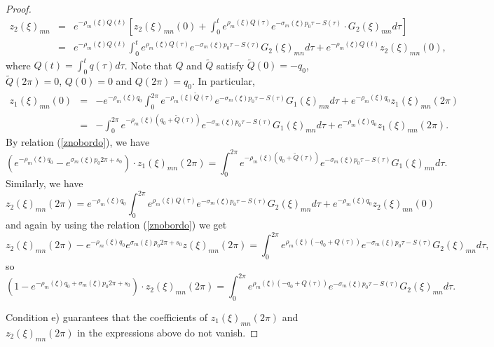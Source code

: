 \documentclass[sn-mathphys-num]{sn-jnl}%
\numberwithin{equation}{section}
\theoremstyle{thmstyleone}
\theoremstyle{thmstyletwo}
\theoremstyle{thmstylethree}
\begin{document}
\begin{proof}
\begin{eqnarray*}
		z_2(\xi)_{mn}& = & e^{-\rho_m(\xi)Q(t)}\left[ z_2(\xi)_{mn}(0)+\int_0^t e^{\rho_m(\xi)Q(\tau)}e^{-\sigma_m(\xi)p_0 \tau -S(\tau)}\cdot G_2(\xi)_{mn}d\tau \right] \\
		& = & e^{-\rho_m(\xi)Q(t)}\int_0^t e^{\rho_m(\xi)Q(\tau)}e^{-\sigma_m(\xi)p_0 \tau -S(\tau)}G_2(\xi)_{mn}d\tau +e^{-\rho_m(\xi)Q(t)}z_2(\xi)_{mn}(0),
\end{eqnarray*}
where $Q(t)=\int_0^t q(\tau)d\tau$. Note that $Q$ and $\widetilde{Q}$ satisfy $\widetilde{Q}(0)=-q_0$, $\widetilde{Q}(2\pi)=0$, $Q(0)=0$ and $Q(2\pi)=q_0$. In particular, 
\begin{eqnarray*} z_1(\xi)_{mn}(0) & = & -e^{-\rho_m(\xi)q_0}\int_0^{2\pi}e^{-\rho_m(\xi)\widetilde{Q}(\tau)}e^{-\sigma_m(\xi)p_0 \tau -S(\tau)}G_1(\xi)_{mn}d\tau +e^{-\rho_m(\xi)q_0}z_1(\xi)_{mn}(2\pi)\\
	& = & -\int_0^{2\pi} e^{-\rho_m(\xi)(q_0+\widetilde{Q}(\tau))}e^{-\sigma_m(\xi)p_0 \tau-S(\tau)}G_1(\xi)_{mn}d\tau +e^{-\rho_m(\xi)q_0}z_1(\xi)_{mn}(2\pi).
\end{eqnarray*} 
By relation (\ref{znobordo}), we have
\begin{equation}\label{z_1nobordo}
	\left( e^{-\rho_m(\xi)q_0}-e^{\sigma_m(\xi)p_0 2\pi+s_0}\right)\cdot z_1(\xi)_{mn}(2\pi) = \int_0^{2\pi} e^{-\rho_m(\xi)(q_0+\widetilde{Q}(\tau))}e^{-\sigma_m(\xi)p_0 \tau-S(\tau)}G_1(\xi)_{mn}d\tau.
\end{equation}
Similarly, we have
$$z_2(\xi)_{mn}(2\pi)=e^{-\rho_m(\xi)q_0}\int_0^{2\pi} e^{\rho_m(\xi)Q(\tau)}e^{-\sigma_m(\xi)p_0 \tau -S(\tau)}G_2(\xi)_{mn}d\tau +e^{-\rho_m(\xi)q_0}z_2(\xi)_{mn}(0)$$
and again by using the relation (\ref{znobordo}) we get
$$z_2(\xi)_{mn}(2\pi)-e^{-\rho_m(\xi)q_0}e^{\sigma_m(\xi)p_0 2\pi+s_0}z(\xi)_{mn}(2\pi)=\int_0^{2\pi} e^{\rho_m(\xi)(-q_0+Q(\tau))}e^{-\sigma_m(\xi)p_0 \tau -S(\tau)}G_2(\xi)_{mn}d\tau,$$
so
\begin{equation}\label{z_2nobordo}
\left(1-e^{-\rho_m(\xi)q_0+\sigma_m(\xi)p_0 2\pi+s_0}  \right)\cdot z_2(\xi)_{mn}(2\pi) = \int_0^{2\pi} e^{\rho_m(\xi)(-q_0+Q(\tau))}e^{-\sigma_m(\xi)p_0 \tau -S(\tau)}G_2(\xi)_{mn}d\tau.
\end{equation}

Condition e) guarantees that the coefficients of $z_1(\xi)_{mn}(2\pi)$ and $z_2(\xi)_{mn}(2\pi)$ in the expressions above do not vanish. 


\end{proof}
\end{document}
